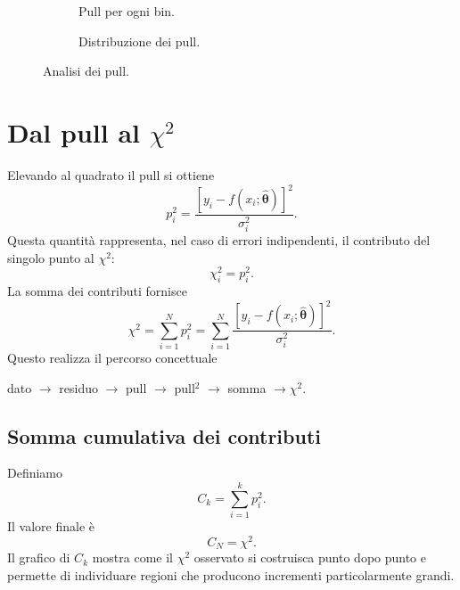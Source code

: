 \documentclass[11pt,a4paper]{book}
\begin{document}
\begin{figure}[htbp]
  \centering
  \begin{subfigure}{0.48\textwidth}
    \centering
    \caption{Pull per ogni bin.}
  \end{subfigure}
  \hfill
  \begin{subfigure}{0.48\textwidth}
    \centering
    \caption{Distribuzione dei pull.}
  \end{subfigure}
  \caption{Analisi dei pull.}
  \label{fig:pull}
\end{figure}

\section{Dal pull al $\chi^2$}
Elevando al quadrato il pull si ottiene
\begin{equation}
 p_i^2=\frac{[y_i-f(x_i;\widehat{\bm\theta})]^2}{\sigma_i^2}.
\end{equation}
Questa quantità rappresenta, nel caso di errori indipendenti, il contributo del singolo punto al $\chi^2$:
\begin{equation}
 \chi_i^2=p_i^2.
\end{equation}
La somma dei contributi fornisce
\begin{equation}
 \boxed{
 \chi^2=\sum_{i=1}^{N}p_i^2
 =\sum_{i=1}^{N}
 \frac{[y_i-f(x_i;\widehat{\bm\theta})]^2}{\sigma_i^2}
 }.
\end{equation}
Questo realizza il percorso concettuale
\begin{center}
 dato $\longrightarrow$ residuo $\longrightarrow$ pull $\longrightarrow$ pull$^2$
 $\longrightarrow$ somma $\longrightarrow\chi^2$.
\end{center}

\subsection{Somma cumulativa dei contributi}
Definiamo
\begin{equation}
 C_k=\sum_{i=1}^{k}p_i^2.
\end{equation}
Il valore finale è
\begin{equation}
 C_N=\chi^2.
\end{equation}
Il grafico di $C_k$ mostra come il $\chi^2$ osservato si costruisca punto dopo punto e permette di individuare regioni che producono incrementi particolarmente grandi.
\end{document}
